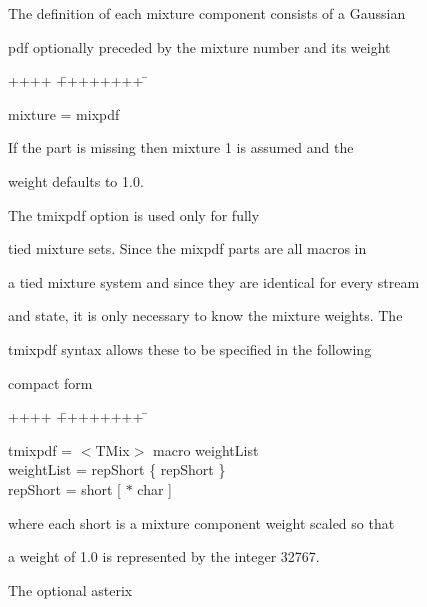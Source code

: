 The definition of each mixture component consists of a Gaussian


pdf optionally preceded by the mixture number and its weight


{\sf


\begin{tabbing}


++++ \= ++++++++ \=  \kill


\>   mixture =  mixpdf


\end{tabbing}


}


\noindent


If the  part is missing then mixture 1 is assumed and the


weight defaults to 1.0. 





The {\sf tmixpdf} option is used only for fully 


tied mixture sets.  Since the {\sf mixpdf} parts are all macros in


a tied mixture system and since they are identical for every stream


and state, it is only necessary to know the mixture weights.  The


{\sf tmixpdf} syntax allows these to be specified in the following


compact form


{\sf


\begin{tabbing}


++++ \= ++++++++ \=  \kill


\>   tmixpdf = \> $<$TMix$>$ macro weightList \\


\>   weightList = \> repShort \{ repShort \} \\


\>   repShort = \> short [ $\ast$ char ]


\end{tabbing}


}


\noindent


where each {\sf short} is a mixture component weight scaled so that


a weight of 1.0 is represented by the integer 32767.  


The optional asterix 


